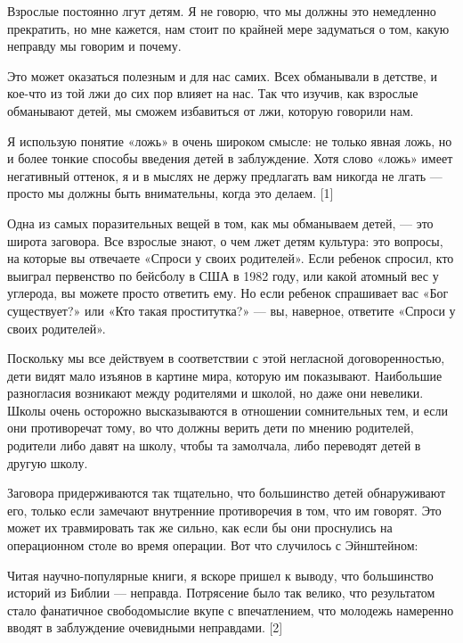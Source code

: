 \documentclass[ebook,12pt,oneside,openany]{memoir}
\begin{document}
\maketitle

Взрослые постоянно лгут детям. Я не говорю, что мы должны это
немедленно прекратить, но мне кажется, нам стоит по крайней мере
задуматься о том, какую неправду мы говорим и почему.

Это может оказаться полезным и для нас самих. Всех обманывали в
детстве, и кое-что из той лжи до сих пор влияет на нас. Так что
изучив, как взрослые обманывают детей, мы сможем избавиться от лжи,
которую говорили нам.

Я использую понятие «ложь» в очень широком смысле: не только явная
ложь, но и более тонкие способы введения детей в заблуждение. Хотя
слово «ложь» имеет негативный оттенок, я и в мыслях не держу
предлагать вам никогда не лгать — просто мы должны быть внимательны,
когда это делаем. [1]

Одна из самых поразительных вещей в том, как мы обманываем детей, —
это широта заговора. Все взрослые знают, о чем лжет детям культура:
это вопросы, на которые вы отвечаете «Спроси у своих родителей». Если
ребенок спросил, кто выиграл первенство по бейсболу в США в 1982 году,
или какой атомный вес у углерода, вы можете просто ответить ему. Но
если ребенок спрашивает вас «Бог существует?» или «Кто такая
проститутка?» — вы, наверное, ответите «Спроси у своих родителей».

Поскольку мы все действуем в соответствии с этой негласной
договоренностью, дети видят мало изъянов в картине мира, которую им
показывают. Наибольшие разногласия возникают между родителями и
школой, но даже они невелики. Школы очень осторожно высказываются в
отношении сомнительных тем, и если они противоречат тому, во что
должны верить дети по мнению родителей, родители либо давят на школу,
чтобы та замолчала, либо переводят детей в другую школу.

Заговора придерживаются так тщательно, что большинство детей
обнаруживают его, только если замечают внутренние противоречия в том,
что им говорят. Это может их травмировать так же сильно, как если бы
они проснулись на операционном столе во время операции. Вот что
случилось с Эйнштейном:

Читая научно-популярные книги, я вскоре пришел к выводу, что
большинство историй из Библии — неправда. Потрясение было так велико,
что результатом стало фанатичное свободомыслие вкупе с впечатлением,
что молодежь намеренно вводят в заблуждение очевидными неправдами. [2]
\end{document}
